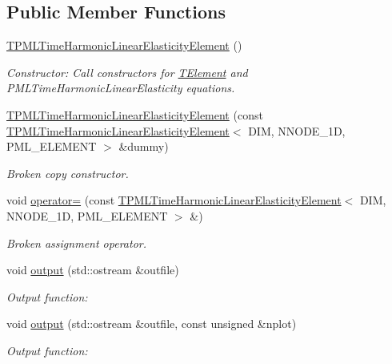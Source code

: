 \subsection*{Public Member Functions}
\begin{DoxyCompactItemize}
\item 
\hyperlink{classoomph_1_1TPMLTimeHarmonicLinearElasticityElement_a5ef9e0f7a53fc48ecd534642ab6aaf1b}{T\+P\+M\+L\+Time\+Harmonic\+Linear\+Elasticity\+Element} ()
\begin{DoxyCompactList}\small\item\em Constructor\+: Call constructors for \hyperlink{classoomph_1_1TElement}{T\+Element} and P\+M\+L\+Time\+Harmonic\+Linear\+Elasticity equations. \end{DoxyCompactList}\item 
\hyperlink{classoomph_1_1TPMLTimeHarmonicLinearElasticityElement_a1e1b7ce2befd4346100a5210d10ba770}{T\+P\+M\+L\+Time\+Harmonic\+Linear\+Elasticity\+Element} (const \hyperlink{classoomph_1_1TPMLTimeHarmonicLinearElasticityElement}{T\+P\+M\+L\+Time\+Harmonic\+Linear\+Elasticity\+Element}$<$ D\+IM, N\+N\+O\+D\+E\+\_\+1D, P\+M\+L\+\_\+\+E\+L\+E\+M\+E\+NT $>$ \&dummy)
\begin{DoxyCompactList}\small\item\em Broken copy constructor. \end{DoxyCompactList}\item 
void \hyperlink{classoomph_1_1TPMLTimeHarmonicLinearElasticityElement_ad3808643b11b3fd8dd9618ff1fed29ce}{operator=} (const \hyperlink{classoomph_1_1TPMLTimeHarmonicLinearElasticityElement}{T\+P\+M\+L\+Time\+Harmonic\+Linear\+Elasticity\+Element}$<$ D\+IM, N\+N\+O\+D\+E\+\_\+1D, P\+M\+L\+\_\+\+E\+L\+E\+M\+E\+NT $>$ \&)
\begin{DoxyCompactList}\small\item\em Broken assignment operator. \end{DoxyCompactList}\item 
void \hyperlink{classoomph_1_1TPMLTimeHarmonicLinearElasticityElement_a9206d6dda1bade58f9cd4dba3e6c645d}{output} (std\+::ostream \&outfile)
\begin{DoxyCompactList}\small\item\em Output function\+: \end{DoxyCompactList}\item 
void \hyperlink{classoomph_1_1TPMLTimeHarmonicLinearElasticityElement_ac28193016db74abe10b78b871ba7b74a}{output} (std\+::ostream \&outfile, const unsigned \&nplot)
\begin{DoxyCompactList}\small\item\em Output function\+: \end{DoxyCompactList}\item 

\end{DoxyCompactItemize}

